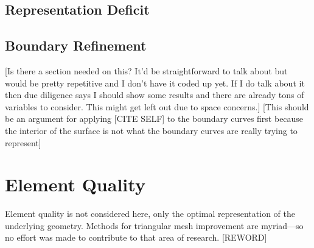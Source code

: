 \subsection{Representation Deficit}



%


\subsection{Boundary Refinement}
[Is there a section needed on this? It'd be straightforward to talk about
but would be pretty repetitive and I don't have it coded up yet. If I do
talk about it then due diligence says I should show some results and
there are already tons of variables to consider. This might get left out
due to space concerns.]
[This should be an argument for applying [CITE SELF] to the boundary
curves first because the interior of the surface is not what the
boundary curves are really trying to represent]

\section{Element Quality}
Element quality is not considered here, only the optimal representation
of the underlying geometry. Methods for triangular mesh improvement are
myriad---so no effort was made to contribute to that area of research.
[REWORD]
